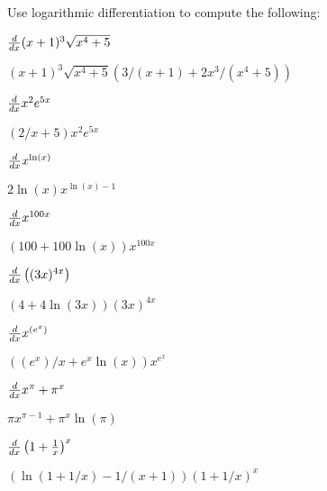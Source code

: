 \begin{exercises}

\noindent Use logarithmic differentiation to compute the following:

\twocol

\begin{exercise}
$\frac{d}{dx} (x+1)^3\sqrt{x^4+5}$
\begin{answer}
$(x+1)^3\sqrt{x^4+5}(3/(x+1) + 2x^3/(x^4+5))$
\end{answer}
\end{exercise}


\begin{exercise}
$\frac{d}{dx} x^2 e^{5x}$
\begin{answer}
$(2/x + 5)x^2e^{5x}$
\end{answer}
\end{exercise}


\begin{exercise}
$\frac{d}{dx} x^{\ln(x)}$
\begin{answer}
$2\ln(x)x^{\ln(x)-1}$
\end{answer}
\end{exercise}


\begin{exercise}
$\frac{d}{dx} x^{100 x}$
\begin{answer}
$(100 + 100 \ln(x))x^{100x}$
\end{answer}
\end{exercise}


\begin{exercise}
$\frac{d}{dx} \left((3x)^{4x}\right)$
\begin{answer}
$(4+ 4\ln(3x)) (3x)^{4x}$
\end{answer}
\end{exercise}


\begin{exercise}
$\frac{d}{dx} x^{(e^x)}$
\begin{answer}
$((e^x)/x+ e^x\ln(x))x^{e^x}$
\end{answer}
\end{exercise}


\begin{exercise}
$\frac{d}{dx} x^\pi + \pi^x$
\begin{answer}
$\pi x^{\pi-1} + \pi^x\ln(\pi)$
\end{answer}
\end{exercise}


\begin{exercise}
$\frac{d}{dx}\left(1+\frac{1}{x}\right)^x$
\begin{answer}
$(\ln(1+1/x) - 1/(x+1))(1+1/x)^x$
\end{answer}
\end{exercise}



\end{exercises}
